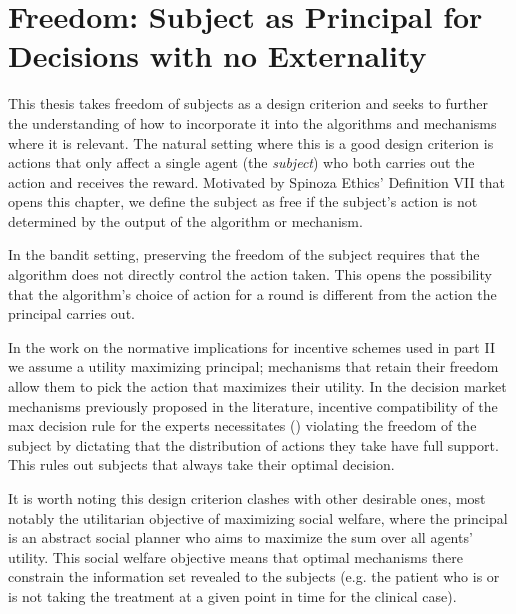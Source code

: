 \section{Freedom: Subject as Principal for Decisions with no Externality}

This thesis takes freedom of subjects as a design criterion and seeks to further the understanding of how to incorporate it into the  algorithms and mechanisms where it is relevant.
The natural setting where this is a good design criterion is actions that only affect a single agent (the \emph{subject}) who both carries out the action and receives the reward.
Motivated by Spinoza Ethics' Definition VII that opens this chapter, we define the subject as free if the subject's action is not determined by the output of the algorithm or mechanism.

In the bandit setting, preserving the freedom of the subject requires that the algorithm does not directly control the action taken.
This opens the possibility that the algorithm's choice of action for a round is different from the action the principal carries out.

In the work on the normative implications for incentive schemes used in part II we assume a utility maximizing principal; mechanisms that retain their freedom allow them to pick the action that maximizes their utility.
In the decision market mechanisms previously proposed in the literature, incentive compatibility of the max decision rule for the experts necessitates (\cite{othman2010decision,chen2014eliciting}) violating the freedom of the subject by dictating that the distribution of actions they take have full support. This rules out subjects that always take their optimal decision.


It is worth noting this design criterion clashes with other desirable ones, most notably the utilitarian objective of maximizing social welfare, where the principal is an abstract social planner who aims to maximize the sum over all agents' utility. This social welfare objective means that optimal mechanisms there \cite{kremer2014implementing,mansour2015bayesian,mansour2016bayesian} constrain the information set revealed to the subjects (e.g. the patient who is or is not taking the treatment at a given point in time for the clinical case).







